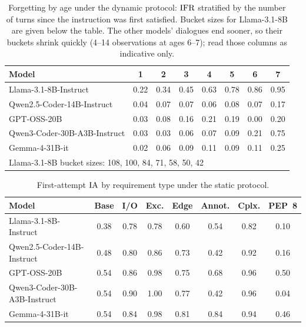 \begin{table}[t]
\centering
\small
\caption{Forgetting by age under the dynamic protocol: $\mathrm{IFR}$ stratified by the
number of turns since the instruction was first satisfied. Bucket sizes for
Llama-3.1-8B are given below the table. The other models' dialogues end
sooner, so their buckets shrink quickly (4--14 observations at ages 6--7);
read those columns as indicative only.}
\label{tab:mtif-age}
\begin{tabular}{lccccccc}
\toprule
Model & 1 & 2 & 3 & 4 & 5 & 6 & 7 \\
\midrule
Llama-3.1-8B-Instruct        & 0.22 & 0.34 & 0.45 & 0.63 & 0.78 & 0.86 & 0.95 \\
Qwen2.5-Coder-14B-Instruct   & 0.04 & 0.07 & 0.07 & 0.06 & 0.08 & 0.07 & 0.17 \\
GPT-OSS-20B                  & 0.03 & 0.08 & 0.16 & 0.21 & 0.19 & 0.00 & 0.20 \\
Qwen3-Coder-30B-A3B-Instruct & 0.03 & 0.03 & 0.06 & 0.07 & 0.09 & 0.21 & 0.75 \\
Gemma-4-31B-it               & 0.02 & 0.06 & 0.09 & 0.11 & 0.09 & 0.11 & 0.25 \\
\midrule
\multicolumn{8}{l}{\footnotesize Llama-3.1-8B bucket sizes: 108, 100, 84, 71, 58, 50, 42} \\
\bottomrule
\end{tabular}
\end{table}

\begin{table}[t]
\centering
\small
\caption{First-attempt $\mathrm{IA}$ by requirement type under the static protocol.}
\label{tab:mtif-type}
\begin{tabular}{lccccccc}
\toprule
Model & Base & I/O & Exc. & Edge & Annot. & Cplx. & PEP~8 \\
\midrule
Llama-3.1-8B-Instruct        & 0.38 & 0.78 & 0.78 & 0.60 & 0.54 & 0.82 & 0.10 \\
Qwen2.5-Coder-14B-Instruct   & 0.48 & 0.80 & 0.86 & 0.73 & 0.42 & 0.92 & 0.16 \\
GPT-OSS-20B                  & 0.54 & 0.86 & 0.98 & 0.75 & 0.68 & 0.96 & 0.50 \\
Qwen3-Coder-30B-A3B-Instruct & 0.54 & 0.90 & 1.00 & 0.77 & 0.42 & 0.96 & 0.04 \\
Gemma-4-31B-it               & 0.54 & 0.84 & 0.98 & 0.81 & 0.84 & 0.94 & 0.46 \\
\bottomrule
\end{tabular}
\end{table}

